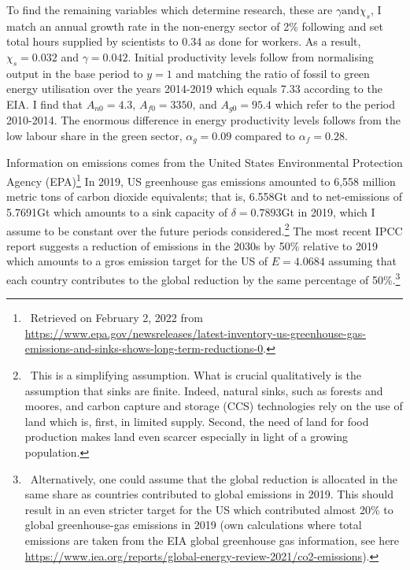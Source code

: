  To find the remaining variables which determine research, these are $\gamma \text{and} \chi_s$, I match an annual growth rate in the non-energy sector of 2\% following \cite{Fried2018ClimateAnalysis} and set total hours supplied by scientists to 0.34 as done for workers. As a result,  $\chi_s=0.032$ and $\gamma=0.042$. Initial productivity levels follow from normalising output in the base period to $y=1$ and matching the ratio of fossil to green energy utilisation over the years 2014-2019 which equals 7.33 according to the EIA. I find that $A_{n0}=4.3$, $A_{f0}=3350$, and $A_{g0}=95.4$ which refer to the period 2010-2014. The enormous difference in energy productivity levels follows from the low labour share in the green sector, $\alpha_g=0.09$ compared to $\alpha_f= 0.28$. 
 
Information on emissions comes from the United States Environmental Protection Agency (EPA)\footnote{\ Retrieved on February 2, 2022 from\\ \url{https://www.epa.gov/newsreleases/latest-inventory-us-greenhouse-gas-emissions-and-sinks-shows-long-term-reductions-0}. } In 2019, US greenhouse gas emissions amounted to 6,558 million metric tons of carbon dioxide equivalents; that is, 6.558Gt and to net-emissions of 5.7691Gt which amounts to a sink capacity of $\delta=0.7893$Gt in 2019, which I assume to be constant over the future periods considered.\footnote{\ This is a simplifying assumption. What is crucial qualitatively is the assumption that sinks are finite. Indeed, natural sinks, such as forests and moores, and carbon capture and storage (CCS) technologies rely on the use of land \citep{VanVuuren2018AlternativeTechnologies} which is, first, in limited supply. Second, the need of land for food production makes land even scarcer especially in light of a growing population.} %
The most recent IPCC report  suggests a reduction of emissions in the 2030s by 50\% relative to 2019 which amounts to a gros emission target for the US of  $E=4.0684$ assuming that each country contributes to the global reduction by the same percentage of 50\%.\footnote{\ Alternatively, one could assume that the global reduction is allocated in the same share as countries contributed to global emissions in 2019. This should result in an even stricter target for the US which contributed almost 20\% to global greenhouse-gas emissions in 2019 (own calculations where total emissions are taken from the EIA global greenhouse gas information, see here \url{https://www.iea.org/reports/global-energy-review-2021/co2-emissions}).}
